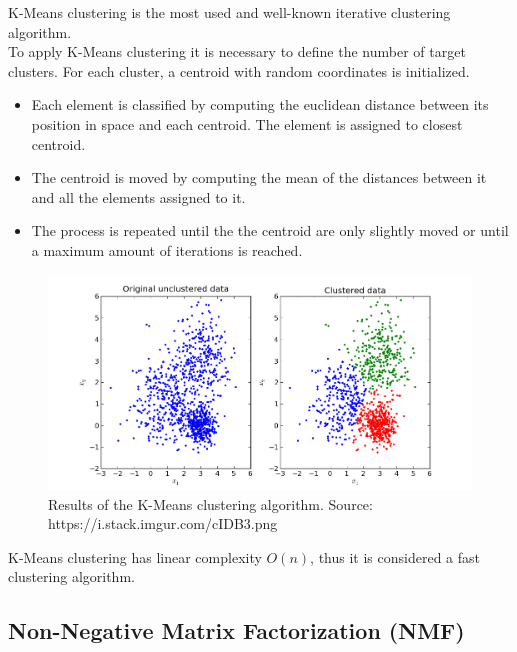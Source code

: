 K-Means clustering is the most used and well-known iterative clustering algorithm.\\
To apply K-Means clustering it is necessary to define the number of target clusters. For each cluster, a centroid with random coordinates is initialized.
\begin{itemize}
\item Each element is classified by computing the euclidean distance between its position in space and each centroid. The element is assigned to closest centroid.
\item The centroid is moved by computing the mean of the distances between it and all the elements assigned to it.
\item The process is repeated until the the centroid are only slightly moved or until a maximum amount of iterations is reached.
\end{itemize}
\begin{figure}[htbp]
	\begin{center}
		\includegraphics[width=\textwidth]{pictures/k-means-clustering}
		\caption{Results of the K-Means clustering algorithm. Source: https://i.stack.imgur.com/cIDB3.png}
	\end{center}
\end{figure}
K-Means clustering has linear complexity $O(n)$, thus it is considered a fast clustering algorithm.


\subsection{Non-Negative Matrix Factorization (NMF)}

